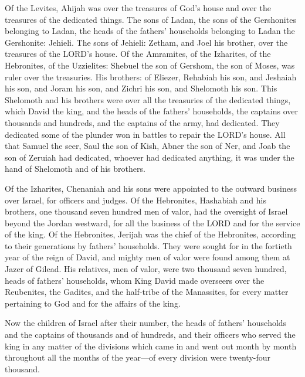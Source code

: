 \myverse{}Of the Levites, Ahijah was over the treasures of God’s house
and over the treasures of the dedicated things.
\myverse{}The sons of Ladan, the sons of the Gershonites belonging to Ladan, the heads
of the fathers’ households belonging to Ladan the Gershonite: Jehieli.
\myverse{}The sons of Jehieli: Zetham, and Joel his brother, over the treasures of
the LORD’s house.
\myverse{}Of the Amramites, of the Izharites, of the Hebronites, of the Uzzielites:
\myverse{}Shebuel the son of Gershom, the son of Moses, was ruler over the treasuries.
\myverse{}His brothers: of Eliezer, Rehabiah his son, and Jeshaiah his son, and Joram
his son, and Zichri his son, and Shelomoth his son.
\myverse{}This Shelomoth and his brothers were over all the treasuries of the dedicated
things, which David the king, and the heads of the fathers’ households, the captains over thousands and
hundreds, and the captains of the army, had dedicated.
\myverse{}They dedicated some of the plunder won in battles to repair the LORD’s house.
\myverse{}All that Samuel the seer, Saul the son of Kish, Abner the son of Ner, and
Joab the son of Zeruiah had dedicated, whoever had dedicated anything, it was under the hand of Shelomoth
and of his brothers.

\myverse{}Of the Izharites, Chenaniah and his sons were appointed to the
outward business over Israel, for officers and judges.
\myverse{}Of the Hebronites, Hashabiah and his brothers, one thousand seven hundred
men of valor, had the oversight of Israel beyond the Jordan westward, for all the business of the LORD
and for the service of the king.
\myverse{}Of the Hebronites, Jerijah was the chief of the Hebronites, according to
their generations by fathers’ households. They were sought for in the fortieth year of the reign of David,
and mighty men of valor were found among them at Jazer of Gilead.
\myverse{}His relatives, men of valor, were two thousand seven hundred, heads of fathers’
households, whom King David made overseers over the Reubenites, the Gadites, and the half-tribe of the
Manassites, for every matter pertaining to God and for the affairs of the king.


\mychapter{} \myverse*{}Now the children of Israel after their number, the heads of fathers’
households and the captains of thousands and of hundreds, and their officers who served the king in any
matter of the divisions which came in and went out month by month throughout all the months of the year—of
every division were twenty-four thousand.


